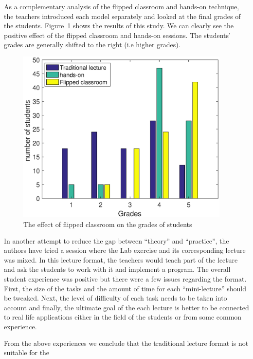 \documentclass{article}
\begin{document}
As a complementary analysis of the flipped classroom and hands-on
technique, the teachers introduced each model separately and looked at
the final grades of the students. Figure~\ref{fig:grades} shows the
results of this study. We can clearly see the positive effect of the
flipped classroom and hands-on sessions. The students' grades are
generally shifted to the right (i.e higher grades).

\begin{figure}[htbp]
	\centering
	\includegraphics[width=0.95\textwidth]{fliped_effect.eps}
	\caption{The effect of flipped classroom on the grades of students}
	\label{fig:grades}
\end{figure}

In another attempt to reduce the gap between ``theory'' and ``practice'', the authors have tried a session where the Lab exercise and its corresponding lecture was mixed. In this lecture format, the teachers would teach part of the lecture and ask the students to work with it and implement a program. The overall student experience was positive but there were a few issues regarding the format. First, the size of the tasks and the amount of time for each ``mini-lecture'' should be tweaked. Next, the level of difficulty of each task needs to be taken into account and finally, the ultimate goal of the each lecture is better to be connected to real life applications either in the field of the students or from some common experience.

From the above experiences we conclude that the traditional lecture format is not suitable for the 
\end{document}
